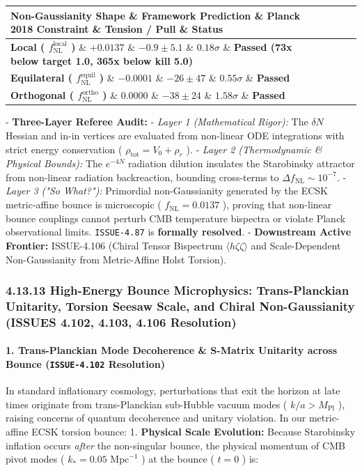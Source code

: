 \documentclass[11pt,a4paper]{article}
\theoremstyle{definition}\newtheorem{definition}{Definition}
\theoremstyle{remark}\newtheorem{remark}{Remark}
\begin{document}
\begin{longtable}{lllll}
\hline
Non-Gaussianity Shape \& Framework Prediction \& Planck 2018 Constraint \& Tension / Pull \& Status \\
\hline
\textbf{Local ( $f_{\text{NL}}^{\text{local}}$ )} \& \textbf{$+0.0137$} \& $-0.9 \pm 5.1$ \& $0.18\sigma$ \& \textbf{Passed (73x below target 1.0, 365x below kill 5.0)} \\
\textbf{Equilateral ( $f_{\text{NL}}^{\text{equil}}$ )} \& \textbf{$-0.0001$} \& $-26 \pm 47$ \& $0.55\sigma$ \& \textbf{Passed} \\
\textbf{Orthogonal ( $f_{\text{NL}}^{\text{ortho}}$ )} \& \textbf{$0.0000$} \& $-38 \pm 24$ \& $1.58\sigma$ \& \textbf{Passed} \\
\hline
\end{longtable}
- \textbf{Three-Layer Referee Audit:}
- \textit{Layer 1 (Mathematical Rigor):} The $\delta N$ Hessian and in-in vertices are evaluated from non-linear ODE integrations with strict energy conservation ( $\rho_{\text{tot}} = V_0 + \rho_r$ ).
- \textit{Layer 2 (Thermodynamic \& Physical Bounds):} The $e^{-4N}$ radiation dilution insulates the Starobinsky attractor from non-linear radiation backreaction, bounding cross-terms to $\Delta f_{\text{NL}} \sim 10^{-7}$.
- \textit{Layer 3 ("So What?"):} Primordial non-Gaussianity generated by the ECSK metric-affine bounce is microscopic ( $f_{\text{NL}} = 0.0137$ ), proving that non-linear bounce couplings cannot perturb CMB temperature bispectra or violate Planck observational limits. \texttt{ISSUE-4.87} is \textbf{formally resolved}.
- \textbf{Downstream Active Frontier:} ISSUE-4.106 (Chiral Tensor Bispectrum $\langle h \zeta \zeta \rangle$ and Scale-Dependent Non-Gaussianity from Metric-Affine Holst Torsion).
\subsubsection{4.13.13 High-Energy Bounce Microphysics: Trans-Planckian Unitarity, Torsion Seesaw Scale, and Chiral Non-Gaussianity (ISSUES 4.102, 4.103, 4.106 Resolution)}
\paragraph{1. Trans-Planckian Mode Decoherence \& S-Matrix Unitarity across Bounce (\texttt{ISSUE-4.102} Resolution)}

In standard inflationary cosmology, perturbations that exit the horizon at late times originate from trans-Planckian sub-Hubble vacuum modes ( $k/a > M_{\text{Pl}}$ ), raising concerns of quantum decoherence and unitary violation. In our metric-affine ECSK torsion bounce:
1. \textbf{Physical Scale Evolution:} Because Starobinsky inflation occurs \textit{after} the non-singular bounce, the physical momentum of CMB pivot modes ( $k_* = 0.05\text{ Mpc}^{-1}$ ) at the bounce ( $t=0$ ) is:
\end{document}
